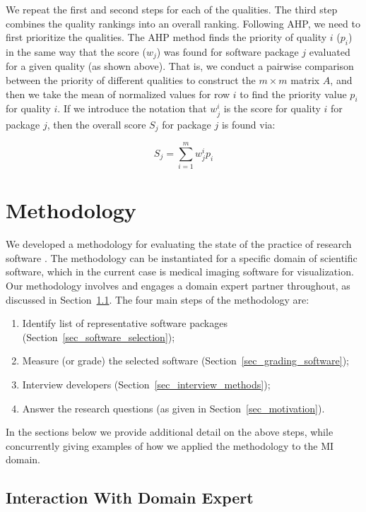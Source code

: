 \documentclass[11pt]{article}
\begin{document}
We repeat the first and second steps for each of the qualities.  The third step
combines the quality rankings into an overall ranking.  Following AHP, we need
to first prioritize the qualities.  The AHP method finds the priority of quality
$i$ ($p_i$) in the same way that the score ($w_j$) was found for software
package $j$ evaluated for a given quality (as shown above).  That is, we
conduct a pairwise comparison between the priority of different qualities to
construct the $m \times m$ matrix $A$, and then we take the mean of normalized
values for row $i$ to find the priority value $p_i$ for quality $i$.  If we
introduce the notation that $w^i_j$ is the score for quality $i$ for package
$j$, then the overall score $S_j$ for package $j$ is found via:

$$S_j = \sum_{i=1}^m w^i_j p_i$$ 

\section{Methodology} \label{ch_methods}

We developed a methodology for evaluating the state of the practice of research
software \citep{SmithEtAl2021, SmithAndMichalski2022}.  The methodology can be
instantiated for a specific domain of scientific software, which in the current
case is medical imaging software for visualization.  Our methodology involves
and engages a domain expert partner throughout, as discussed in
Section~\ref{sec_vet_software_list}.  The four main steps of the methodology
are:

\begin{enumerate}
\item Identify list of representative software packages
(Section~\ref{sec_software_selection});
\item Measure (or grade) the selected software
(Section~\ref{sec_grading_software});
\item Interview developers (Section~\ref{sec_interview_methods});
\item Answer the research questions (as given in Section~\ref{sec_motivation}).
\end{enumerate}

In the sections below we provide additional detail on the above steps, while
concurrently giving examples of how we applied the methodology to the MI domain.

\subsection{Interaction With Domain Expert} \label{sec_vet_software_list}
\end{document}
